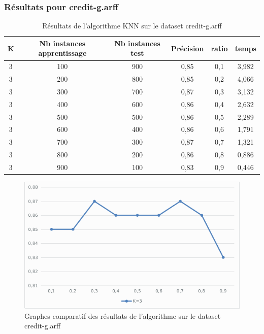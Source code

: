 	\subsubsection{Résultats pour credit-g.arff}
		\begin{table}[H]
			\centering
			\begin{tabular}{|c|c|c|c|c|c|}
				\hline
				\textbf{K} & \textbf{Nb instances apprentissage} & \textbf{Nb instances test} & \textbf{Précision} & \textbf{ratio} & \textbf{temps} \\ \hline
				3          & 100                                 & 900                        & 0,85               & 0,1            & 3,982          \\
				3          & 200                                 & 800                        & 0,85               & 0,2            & 4,066          \\
				3          & 300                                 & 700                        & 0,87               & 0,3            & 3,132          \\
				3          & 400                                 & 600                        & 0,86               & 0,4            & 2,632          \\
				3          & 500                                 & 500                        & 0,86               & 0,5            & 2,289          \\
				3          & 600                                 & 400                        & 0,86               & 0,6            & 1,791          \\
				3          & 700                                 & 300                        & 0,87               & 0,7            & 1,321          \\
				3          & 800                                 & 200                        & 0,86               & 0,8            & 0,886          \\
				3          & 900                                 & 100                        & 0,83               & 0,9            & 0,446          \\ \hline
			\end{tabular}
			\caption{Résultats de l'algorithme KNN sur le dataset credit-g.arff}
			\label{my-label}
		\end{table}
		\begin{figure}[H]
			\centering
			\includegraphics[width=0.75\linewidth]{knn/images/graph_credit.png}
			\caption{Graphes comparatif des résultats de l'algorithme sur le dataset credit-g.arff}
		\end{figure}

